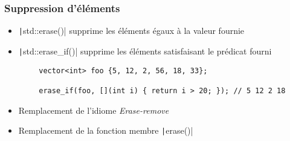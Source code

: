 \documentclass[C++.tex]{subfiles}
\begin{document}
\begin{frame}[fragile]
	\frametitle{Suppression d'éléments}
	\begin{itemize}
		\item \texttt|std::erase()| supprime les éléments égaux à la valeur fournie
		\item \texttt|std::erase_if()| supprime les éléments satisfaisant le prédicat fourni
	\end{itemize}

	\begin{verbatim}
		vector<int> foo {5, 12, 2, 56, 18, 33};

		erase_if(foo, [](int i) { return i > 20; }); // 5 12 2 18
	\end{verbatim}

	\begin{itemize}
		\item Remplacement de l'idiome \og \textit{Erase-remove}\fg{}
		\item Remplacement de la fonction membre \texttt|erase()|
	\end{itemize}


\end{frame}
\end{document}
